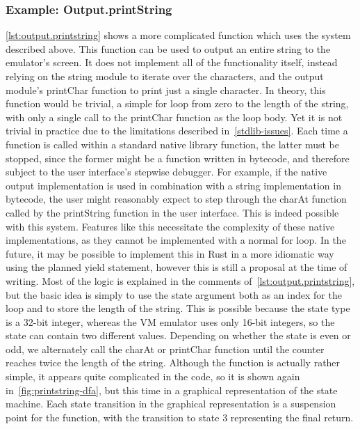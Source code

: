 \subsubsection{Example: Output.printString} \label{complex-example}
\cref{lst:output.printstring} shows a more complicated function which uses the system described above.
This function can be used to output an entire string to the emulator's screen.
It does not implement all of the functionality itself, instead relying on the string module to iterate over the characters, and the output module's printChar function to print just a single character.
In theory, this function would be trivial, a simple for loop from zero to the length of the string, with only a single call to the printChar function as the loop body.
Yet it is not trivial in practice due to the limitations described in~\cref{stdlib-issues}.
Each time a function is called within a standard native library function, the latter must be stopped, since the former might be a function written in bytecode, and therefore subject to the user interface's stepwise debugger.
For example, if the native output implementation is used in combination with a string implementation in bytecode, the user might reasonably expect to step through the charAt function called by the printString function in the user interface.
This is indeed possible with this system.
Features like this necessitate the complexity of these native implementations, as they cannot be implemented with a normal for loop.
In the future, it may be possible to implement this in Rust in a more idiomatic way using the planned yield statement, however this is still a proposal at the time of writing.
Most of the logic is explained in the comments of~\cref{lst:output.printstring}, but the basic idea is simply to use the state argument both as an index for the loop and to store the length of the string.
This is possible because the state type is a 32-bit integer, whereas the VM emulator uses only 16-bit integers, so the state can contain two different values.
Depending on whether the state is even or odd, we alternately call the charAt or printChar function until the counter reaches twice the length of the string.
Although the function is actually rather simple, it appears quite complicated in the code, so it is shown again in~\cref{fig:printstring-dfa}, but this time in a graphical representation of the state machine.
Each state transition in the graphical representation is a suspension point for the function, with the transition to state \(3\) representing the final return.

